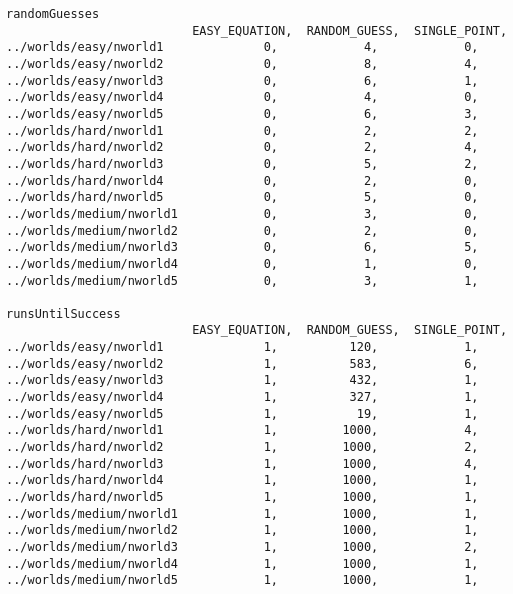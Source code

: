 \documentclass[british]{article}
\begin{document}
\begin{lstlisting}
randomGuesses
                          EASY_EQUATION,  RANDOM_GUESS,  SINGLE_POINT,
../worlds/easy/nworld1              0,            4,            0,
../worlds/easy/nworld2              0,            8,            4,
../worlds/easy/nworld3              0,            6,            1,
../worlds/easy/nworld4              0,            4,            0,
../worlds/easy/nworld5              0,            6,            3,
../worlds/hard/nworld1              0,            2,            2,
../worlds/hard/nworld2              0,            2,            4,
../worlds/hard/nworld3              0,            5,            2,
../worlds/hard/nworld4              0,            2,            0,
../worlds/hard/nworld5              0,            5,            0,
../worlds/medium/nworld1            0,            3,            0,
../worlds/medium/nworld2            0,            2,            0,
../worlds/medium/nworld3            0,            6,            5,
../worlds/medium/nworld4            0,            1,            0,
../worlds/medium/nworld5            0,            3,            1,

runsUntilSuccess
                          EASY_EQUATION,  RANDOM_GUESS,  SINGLE_POINT,
../worlds/easy/nworld1              1,          120,            1,
../worlds/easy/nworld2              1,          583,            6,
../worlds/easy/nworld3              1,          432,            1,
../worlds/easy/nworld4              1,          327,            1,
../worlds/easy/nworld5              1,           19,            1,
../worlds/hard/nworld1              1,         1000,            4,
../worlds/hard/nworld2              1,         1000,            2,
../worlds/hard/nworld3              1,         1000,            4,
../worlds/hard/nworld4              1,         1000,            1,
../worlds/hard/nworld5              1,         1000,            1,
../worlds/medium/nworld1            1,         1000,            1,
../worlds/medium/nworld2            1,         1000,            1,
../worlds/medium/nworld3            1,         1000,            2,
../worlds/medium/nworld4            1,         1000,            1,
../worlds/medium/nworld5            1,         1000,            1,


 \end{lstlisting}
 
\end{document}
